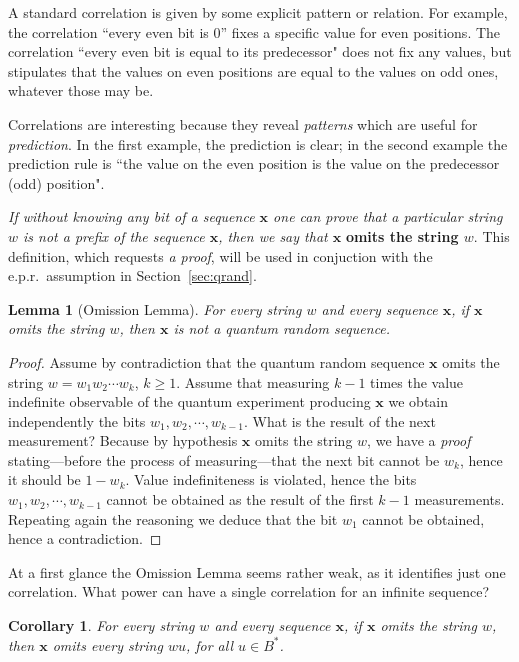 \documentclass[%
 preprint,
 showpacs,
 showkeys,
 preprintnumbers,
  amsmath,amssymb,
  aps,
 pra,
  longbibliography,
  floatfix,
 ]{revtex4-1}
\theoremstyle{plain}
\newtheorem{lemma}[theorem]{Lemma}
\newtheorem{corollary}[theorem]{Corollary}
\newcommand{\x}{\mathbf{x}}
\begin{document}
A standard correlation is given by some explicit pattern or relation.  For example, the correlation ``every even bit is 0'' fixes a specific value for even positions. The correlation ``every even bit is equal to its predecessor" does not fix any values, but stipulates that the  values on even positions are equal to the values on odd ones, whatever those may be.

Correlations are interesting because they reveal {\em patterns} which are useful for {\em prediction}. In the first example, the prediction is clear; in the second example the prediction  rule  is ``the value on the even position is the value  on the predecessor (odd)  position".

\medskip

 {\em If without knowing any bit of a sequence $\x$ one can {\rm prove} that a particular string $w$ is not a prefix of the sequence
 $\x$, then we say that $\x$} {\bf omits the string $w$}. This definition, which requests {\em a proof}, will be used in conjuction with the e.p.r.\ assumption in Section~\ref{sec:qrand}.



\begin{lemma}[Omission Lemma]
\label{lem:omission} For every string $w$ and every  sequence  $\x$, if  $\x$
omits the string $w$, then $\x$ is not a quantum random sequence.
\end{lemma}
\begin{proof}
Assume by contradiction that the quantum random sequence $\x$ omits the string $w=w_1w_2\cdots w_k$, $k\ge 1$. Assume that measuring $k-1$ times the value indefinite observable of the quantum experiment producing $\x$  we  obtain independently the bits $w_1, w_2, \cdots ,w_{k-1}$. What is the result of the next measurement? Because by hypothesis  $\x$
omits the string $w$,  we have a {\em proof} stating---before the process of measuring---that the next bit cannot be $w_{k}$, hence it should be  $1-w_k$. Value indefiniteness is violated, hence the bits $w_1, w_2, \cdots ,w_{k-1}$ cannot be obtained as the result of the first $k-1$ measurements.
Repeating again the reasoning we deduce that the bit $w_1$ cannot be obtained, hence a contradiction.
\end{proof}


At a first glance the Omission Lemma seems rather weak, as it identifies just one correlation. What power can have a single correlation for an infinite sequence?


\begin{corollary}
\label{cor:infiniteomission}
For every string $w$ and every  sequence  $\x$, if  $\x$
omits the string $w$, then $\x$ omits every string $wu$, for all $u\in B^{*}$.
\end{corollary}
\end{document}
